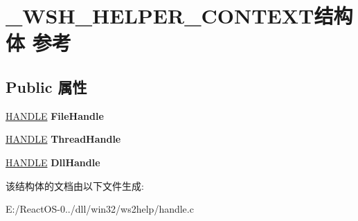 \hypertarget{struct___w_s_h___h_e_l_p_e_r___c_o_n_t_e_x_t}{}\section{\+\_\+\+W\+S\+H\+\_\+\+H\+E\+L\+P\+E\+R\+\_\+\+C\+O\+N\+T\+E\+X\+T结构体 参考}
\label{struct___w_s_h___h_e_l_p_e_r___c_o_n_t_e_x_t}
\subsection*{Public 属性}
\begin{DoxyCompactItemize}
\item 
\mbox{\label{struct___w_s_h___h_e_l_p_e_r___c_o_n_t_e_x_t_a13c371da1c0ce64e936162d36ab6e958}} 
\hyperlink{interfacevoid}{H\+A\+N\+D\+LE} {\bfseries File\+Handle}
\item 
\mbox{\label{struct___w_s_h___h_e_l_p_e_r___c_o_n_t_e_x_t_a7593bf9c14853ce86d029a4eb069c856}} 
\hyperlink{interfacevoid}{H\+A\+N\+D\+LE} {\bfseries Thread\+Handle}
\item 
\mbox{\label{struct___w_s_h___h_e_l_p_e_r___c_o_n_t_e_x_t_ad9d038ea834f17202b0f3ad3f1b99bfb}} 
\hyperlink{interfacevoid}{H\+A\+N\+D\+LE} {\bfseries Dll\+Handle}
\end{DoxyCompactItemize}


该结构体的文档由以下文件生成\+:\begin{DoxyCompactItemize}
\item 
E\+:/\+React\+O\+S-\/0../dll/win32/ws2help/handle.\+c\end{DoxyCompactItemize}
